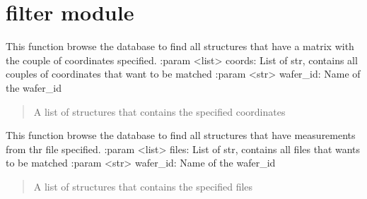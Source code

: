 \documentclass[letterpaper,10pt,english]{sphinxmanual}
\begin{document}
\sphinxstepscope


\chapter{filter module}
\label{\detokenize{filter:module-filter}}\label{\detokenize{filter:filter-module}}\label{\detokenize{filter::doc}}

\begin{fulllineitems}
\label{\detokenize{filter:filter.filter_by_coord}}
\pysigstartsignatures
{}
\pysigstopsignatures
\sphinxAtStartPar
This function browse the database to find all structures that have a matrix with the couple of coordinates specified.
:param \textless{}list\textgreater{} coords: List of str, contains all couples of coordinates that want to be matched
:param \textless{}str\textgreater{} wafer\_id: Name of the wafer\_id
\begin{quote}\begin{description}
\sphinxAtStartPar
A list of structures that contains the specified coordinates

\end{description}\end{quote}

\end{fulllineitems}


\begin{fulllineitems}
\label{\detokenize{filter:filter.filter_by_filename}}
\pysigstartsignatures
{}
\pysigstopsignatures
\sphinxAtStartPar
This function browse the database to find all structures that have measurements from thr file specified.
:param \textless{}list\textgreater{} files: List of str, contains all files that wants to be matched
:param \textless{}str\textgreater{} wafer\_id: Name of the wafer\_id
\begin{quote}\begin{description}
\sphinxAtStartPar
A list of structures that contains the specified files

\end{description}\end{quote}

\end{fulllineitems}
\end{document}
